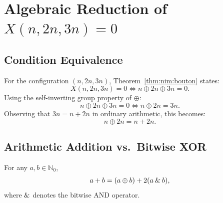 ﻿\documentclass[a4paper]{article}
\begin{document}
\section{Algebraic Reduction of $X(n, 2n, 3n) = 0$}

\subsection{Condition Equivalence}
For the configuration $(n, 2n, 3n)$, Theorem~\ref{thm:nim:bouton} states:
\begin{equation}
X(n, 2n, 3n) = 0 \iff n \oplus 2n \oplus 3n = 0.
\end{equation}
Using the self-inverting group property of $\oplus$:
\begin{equation}
n \oplus 2n \oplus 3n = 0 \iff n \oplus 2n = 3n.
\end{equation}
Observing that $3n = n + 2n$ in ordinary arithmetic, this becomes:
\begin{equation}\label{eq:nim:xor_sum_eq_arith_sum}
n \oplus 2n = n + 2n.
\end{equation}

\subsection{Arithmetic Addition vs.\ Bitwise XOR}

\begin{lemma}\label{lem:nim:add_xor_identity}
For any $a, b \in \mathbb{N}_0$,
\begin{equation}\label{eq:nim:add_xor_formula}
a + b = (a \oplus b) + 2(a \mathbin{\&} b),
\end{equation}
where $\mathbin{\&}$ denotes the bitwise AND operator.
\end{lemma}
\end{document}
